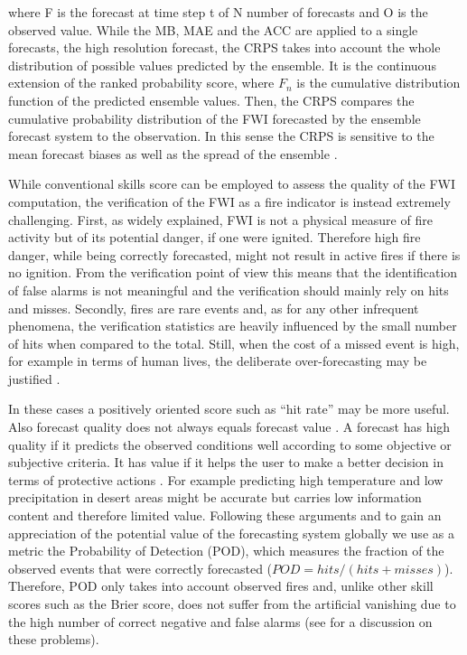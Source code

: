 \documentclass[, manuscript]{copernicus}
\begin{document}
where F is the forecast at time step t of N number of forecasts and O is
the observed value. While the MB, MAE and the ACC are applied to a
single forecasts, the high resolution forecast, the CRPS takes into
account the whole distribution of possible values predicted by the
ensemble. It is the continuous extension of the ranked probability
score, where \(F_n\) is the cumulative distribution function of the
predicted ensemble values. Then, the CRPS compares the cumulative
probability distribution of the FWI forecasted by the ensemble forecast
system to the observation. In this sense the CRPS is sensitive to the
mean forecast biases as well as the spread of the ensemble
\citep{hersbach2000}.

While conventional skills score can be employed to assess the quality of
the FWI computation, the verification of the FWI as a fire indicator is
instead extremely challenging. First, as widely explained, FWI is not a
physical measure of fire activity but of its potential danger, if one
were ignited. Therefore high fire danger, while being correctly
forecasted, might not result in active fires if there is no ignition.
From the verification point of view this means that the identification
of false alarms is not meaningful and the verification should mainly
rely on hits and misses. Secondly, fires are rare events and, as for any
other infrequent phenomena, the verification statistics are heavily
influenced by the small number of hits when compared to the total.
Still, when the cost of a missed event is high, for example in terms of
human lives, the deliberate over-forecasting may be justified
\citep{richardson:00,cloke:17}.

In these cases a positively oriented score such as ``hit rate'' may be
more useful. Also forecast quality does not always equals forecast value
\citep{richardson:00}. A forecast has high quality if it predicts the
observed conditions well according to some objective or subjective
criteria. It has value if it helps the user to make a better decision in
terms of protective actions \citep{cloke:17}. For example predicting
high temperature and low precipitation in desert areas might be accurate
but carries low information content and therefore limited value.
Following these arguments and to gain an appreciation of the potential
value of the forecasting system globally we use as a metric the
Probability of Detection (POD), which measures the fraction of the
observed events that were correctly forecasted
(\(POD=hits/(hits+misses)\)). Therefore, POD only takes into account
observed fires and, unlike other skill scores such as the Brier score,
does not suffer from the artificial vanishing due to the high number of
correct negative and false alarms (see \citet{stephenson:08,ferro:11}
for a discussion on these problems).
\end{document}
